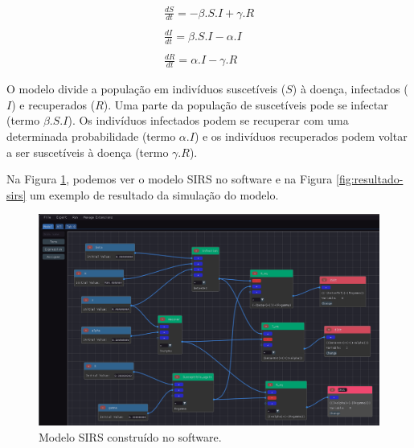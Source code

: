 \documentclass[
	12pt,				%
	openright,			%
	oneside,			%
	a4paper,			%
	main=brazil,
	english,			%
	]{ufsj-abntex2}
\begin{document}
\begin{equation}\label{eq:sirs}
    \begin{array}{lr}
    \frac{dS}{dt} = -\beta.S.I + \gamma.R
    \\
    \\
    \frac{dI}{dt} = \beta.S.I - \alpha.I
    \\
    \\ 
    \frac{dR}{dt} = \alpha.I - \gamma.R
    \end{array}
\end{equation}

O modelo divide a população em indivíduos suscetíveis ($S$) à doença, infectados ($I$) e recuperados ($R$). Uma parte da população de suscetíveis pode se infectar (termo $\beta.S.I$). Os indivíduos infectados podem se recuperar com uma determinada probabilidade (termo $\alpha.I$) e os indivíduos recuperados podem voltar a ser suscetíveis à doença (termo $\gamma.R$).  

Na Figura \ref{fig:sirs}, podemos ver o modelo SIRS no software e na Figura \ref{fig:resultado-sirs} um exemplo de resultado da simulação do modelo. 

\begin{figure}[h]
    \centering
    \includegraphics[width=\textwidth]{imgs/modelos/sirs.png} 
    \caption{Modelo SIRS construído no software.}
    \label{fig:sirs}
\end{figure}
\end{document}
